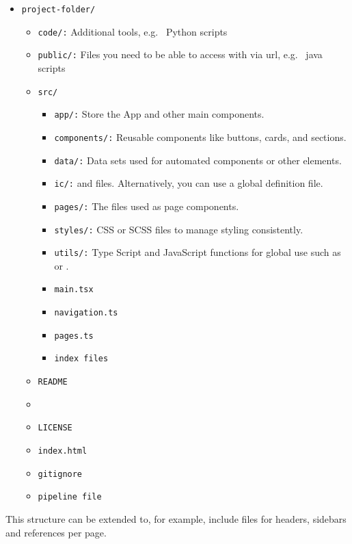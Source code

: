 \begin{itemize}
    \item \texttt{project-folder/}
    \begin{itemize}
        \item \texttt{code/:} Additional tools, e.g. \ Python scripts
        \item \texttt{public/:} Files you need to be able to access with via url, e.g. \ java scripts
        \item \texttt{src/}
        \begin{itemize}
            \item \texttt{app/:} Store the App and other main components.
            \item \texttt{components/:} Reusable components like buttons, cards, and sections.
            \item \texttt{data/:} Data sets used for automated components or other elements.
            \item \texttt{ic/:}  and  files.
            Alternatively, you can use a global definition file.
            \item \texttt{pages/:} The files used as page components.
            \item \texttt{styles/:} CSS or SCSS files to manage styling consistently.
            \item \texttt{utils/:} Type Script and JavaScript functions for global use such as  or .
            \item \texttt{main.tsx}
            \item \texttt{navigation.ts}
            \item \texttt{pages.ts}
            \item \texttt{index files}
        \end{itemize}
        \item \texttt{README}
        \item \texttt{}
        \item \texttt{LICENSE}
        \item \texttt{index.html}
        \item \texttt{gitignore}
        \item \texttt{pipeline file}
    \end{itemize}
\end{itemize}
This structure can be extended to, for example, include files for headers, sidebars and references per page.

